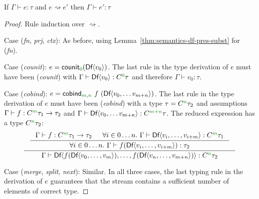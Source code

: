 \begin{theorem}
\label{thm:semantics-df-pres}
  If $\Gamma \vdash e : \tau$ and $e \rightsquigarrow e'$ then $\Gamma \vdash e' : \tau$
\end{theorem}
\begin{proof}
  Rule induction over $\rightsquigarrow$.

\vspace{0.25em}\noindent\hangindent=0.6cm
Case (\emph{fn}, \emph{prj}, \emph{ctx}): As before, using Lemma~\ref{thm:semantics-df-pres-subst} for (\emph{fn}).

\vspace{0.25em}\noindent\hangindent=0.6cm
Case (\emph{counit}): $e = \ident{counit}_{\cclrd{0}}(\ident{Df} \langle v_0 \rangle)$. The last rule in the type
  derivation of $e$ must have been (\emph{counit}) with $\Gamma \vdash \ident{Df} \langle v_0 \rangle : \ctyp{\cclrd{0}}\tau$
  and therefore $\Gamma \vdash v_0 : \tau$.

\vspace{0.25em}\noindent\hangindent=0.6cm
Case (\emph{cobind}): $e = \ident{cobind}_{\cclrd{m}, \cclrd{n}}~f~(\ident{Df}\langle v_0, \ldots v_{m+n} \rangle)$. The
  last rule in the type derivation of $e$ must have been (\emph{cobind}) with a type $\tau = \ctyp{\cclrd{n}}\tau_2$ and assumptions
  $\Gamma \vdash f : \ctyp{\cclrd{m}}{\tau_1} \rightarrow \tau_2$ and $\Gamma \vdash \ident{Df}\langle v_0, \ldots v_{m+n} \rangle : \ctyp{\cclrd{m+n}}{\tau}$.
  The reduced expression has a type $\ctyp{\cclrd{n}}\tau_2$:
\begin{equation*}
\inference
  { \inference
      { \Gamma \vdash f : \ctyp{\cclrd{m}}{\tau_1} \rightarrow \tau_2 & \forall i\in 0 \ldots n.~\Gamma\vdash \ident{Df}\langle v_i, \ldots, v_{i+m} \rangle :  \ctyp{\cclrd{m}}{\tau_1}}
      { \forall i\in 0 \ldots n.~\Gamma\vdash f (\ident{Df}\langle v_i, \ldots, v_{i+m} \rangle) : \tau_2} }
  { \Gamma \vdash \ident{Df}\langle f (\ident{Df}\langle v_0, \ldots, v_m \rangle), \ldots, f (\ident{Df}\langle v_{n}, \ldots, v_{m+n} \rangle) \rangle : \ctyp{\cclrd{n}}\tau_2 }
\end{equation*}

\vspace{0.25em}\noindent\hangindent=0.6cm
Case (\emph{merge}, \emph{split}, \emph{next}): Similar. In all three cases, the last typing rule in the derivation of $e$
  guarantees that the stream contains a sufficient number of elements of correct type.
\end{proof}

